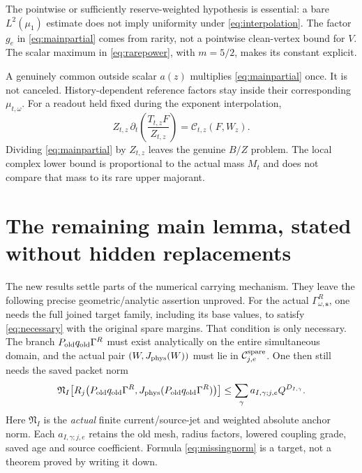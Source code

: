 \documentclass[11pt,letterpaper]{article}
\numberwithin{equation}{section}
\theoremstyle{plain}
\theoremstyle{remark}\newtheorem{remark}[theorem]{Scope}
\begin{document}
The pointwise or sufficiently reserve-weighted hypothesis is essential:
a bare $L^2(\mu_1)$ estimate does not imply uniformity under
\eqref{eq:interpolation}. The factor $g_e$ in
\eqref{eq:mainpartial} comes from rarity, not a pointwise clean-vertex
bound for $V$. The scalar maximum in \eqref{eq:rarepower}, with
$m=5/2$, makes its constant explicit.

A genuinely common outside scalar $a(z)$ multiplies
\eqref{eq:mainpartial} once. It is not canceled. History-dependent
reference factors stay inside their corresponding $\mu_{t,\omega}$.
For a readout held fixed during the exponent interpolation,
\begin{equation}
 Z_{t,z}\,\partial_t\left(\frac{T_{t,z}F}{Z_{t,z}}\right)
 =\mathcal C_{t,z}(F,W_z).
 \label{eq:normalizedderiv}
\end{equation}
Dividing \eqref{eq:mainpartial} by $Z_{t,z}$ leaves the genuine $B/Z$
problem. The local complex lower bound is proportional to the actual
mass $M_t$ and does not compare that mass to its rare upper majorant.

\section{The remaining main lemma, stated without hidden replacements}

The new results settle parts of the numerical carrying mechanism. They
leave the following precise geometric/analytic assertion unproved.
For the actual $\Gamma^R_{\omega,\mathbf s}$, one needs the full joined
target family, including its base values, to satisfy
\eqref{eq:necessary} with the original spare margins. That condition is
only necessary. The branch $P_{\rm old}q_{\rm old}\Gamma^R$ must exist
analytically on the entire simultaneous domain, and the actual pair
$(W,J_{\rm phys}(W))$ must lie in $\mathcal C^{\rm spare}_{j,e}$.
One then still needs the saved packet norm
\begin{equation}
 \mathfrak N_I\!\left[
 R_j\bigl(P_{\rm old}q_{\rm old}\Gamma^R,
     J_{\rm phys}(P_{\rm old}q_{\rm old}\Gamma^R)\bigr)\right]
 \le\sum_\gamma a_{I,\gamma;j,e}Q^{D_{I,\gamma}}.
 \label{eq:missingnorm}
\end{equation}
Here $\mathfrak N_I$ is the \emph{actual} finite current/source-jet and
weighted absolute anchor norm. Each $a_{I,\gamma;j,e}$ retains the old
mesh, radius factors, lowered coupling grade, saved age and source
coefficient. Formula \eqref{eq:missingnorm} is a target, not a theorem
proved by writing it down.
\end{document}

